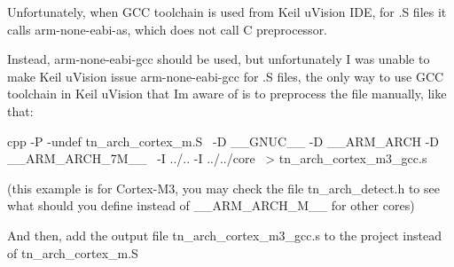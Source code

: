 Unfortunately, when G\+CC toolchain is used from Keil u\+Vision I\+DE, for {\ttfamily .S} files it calls {\ttfamily arm-\/none-\/eabi-\/as}, which does not call C preprocessor.

Instead, {\ttfamily arm-\/none-\/eabi-\/gcc} should be used, but unfortunately I was unable to make Keil u\+Vision issue {\ttfamily arm-\/none-\/eabi-\/gcc} for {\ttfamily .S} files, the only way to use G\+CC toolchain in Keil u\+Vision that I\textquotesingle{}m aware of is to preprocess the file manually, like that\+: \begin{DoxyVerb}cpp -P -undef tn_arch_cortex_m.S                         \
      -D __GNUC__ -D __ARM_ARCH -D __ARM_ARCH_7M__       \
      -I ../.. -I ../../core                             \
      > tn_arch_cortex_m3_gcc.s
\end{DoxyVerb}


(this example is for Cortex-\/\+M3, you may check the file {\ttfamily tn\+\_\+arch\+\_\+detect.\+h} to see what should you define instead of {\ttfamily \+\_\+\+\_\+\+A\+R\+M\+\_\+\+A\+R\+C\+H\+\_\+M\+\_\+\+\_\+} for other cores)

And then, add the output file {\ttfamily tn\+\_\+arch\+\_\+cortex\+\_\+m3\+\_\+gcc.\+s} to the project instead of {\ttfamily tn\+\_\+arch\+\_\+cortex\+\_\+m.\+S} 